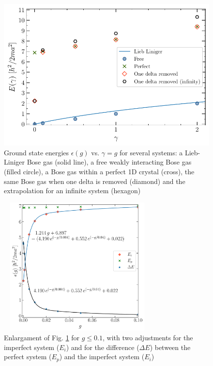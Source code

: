 \documentclass[twocolumn,showpacs,showkeys,preprintnumbers,superscriptaddress, pra, 10pt, aps]{revtex4-2}
\begin{document}
\begin{figure}[H]
  \includegraphics[width=\linewidth]{Energia.pdf}
  \caption{ Ground state energies $\epsilon(g)$ vs. $\gamma = g$ for several systems: a Lieb-Liniger Bose gas (solid line), a free weakly interacting Bose gas (filled circle), a Bose gas within a perfect 1D crystal (cross), the same Bose gas when one delta is removed (diamond) and the extrapolation for an infinite system (hexagon)}%
  \label{fig:Lieb}
\end{figure}

\begin{figure}[H]
  \includegraphics[height=7.0cm, width=8.0cm]{DiferenciaZoom.pdf}
  \caption{Enlargament of Fig. \ref{fig:Lieb} for $g \leq 0.1$, with two adjustments for the imperfect system ($E_i$) and for the difference ($\Delta E$) between the perfect system ($E_p$) and the imperfect system ($E_i$)}%
  \label{fig:LiebZoom}
\end{figure}
\end{document}
